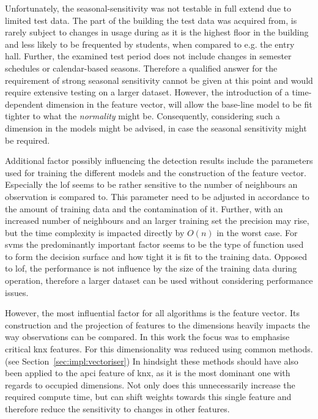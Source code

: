 Unfortunately, the seasonal-sensitivity was not testable in full extend due to limited test data.
The part of the building the test data was acquired from, is rarely subject to changes in usage during as it is the highest floor in the building and less likely to be frequented by students, when compared to e.g. the entry hall.
Further, the examined test period does not include changes in semester schedules or calendar-based seasons.
Therefore a qualified answer for the requirement of strong seasonal sensitivity cannot be given at this point and would require extensive testing on a larger dataset.
However, the introduction of a time-dependent dimension in the feature vector, will allow the base-line model to be fit tighter to what the \emph{normality} might be. Consequently, considering such a dimension in the models might be advised, in case the seasonal sensitivity might be required.

Additional factor possibly influencing the detection results include the parameters used for training the different models and the construction of the feature vector.
Especially the \gls{lof} seems to be rather sensitive to the number of neighbours an observation is compared to. This parameter need to be adjusted in accordance to the amount of training data and the contamination of it. Further, with an increased number of neighbours and an larger training set the precision may rise, but the time complexity is impacted directly by \(O(n)\) in the worst case.
For \glspl{svm} the predominantly important factor seems to be the type of function used to form the decision surface and how tight it is fit to the training data. Opposed to \gls{lof}, the performance is not influence by the size of the training data during operation, therefore a larger dataset can be used without considering performance issues.

However, the most influential factor for all algorithms is the feature vector.
Its construction and the projection of features to the dimensions heavily impacts the way observations can be compared.
In this work the focus was to emphasise critical \gls{knx} features. For this dimensionality was reduced using common methods. (see Section~\ref{sec:impl:vectoriser}) In hindsight these methods should have also been applied to the \gls{apci} feature of \gls{knx}, as it is the most dominant one with regards to occupied dimensions. Not only does this unnecessarily increase the required compute time, but can shift weights towards this single feature and therefore reduce the sensitivity to changes in other features.

